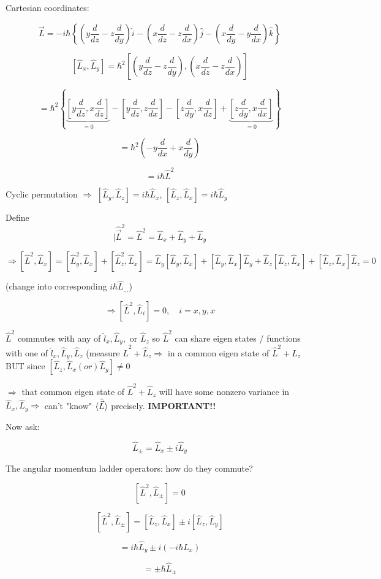 \documentclass{article}
\begin{document}
Cartesian coordinates:

$$\hat{\vec{L}} = -i \hbar \left\{ \left( y \frac{d}{dz} - z \frac{d}{dy} \right) \hat{i} - \left( x \frac{d}{dz} - z \frac{d}{dx} \right) \hat{j} - \left( x \frac{d}{dy} - y \frac{d}{dx} \right) \hat{k} \right\}$$

$$[\hat{L}_x, \hat{L}_y] = \hbar^2 \left[ \left( y \frac{d}{dz} - z \frac{d}{dy} \right), \left( x \frac{d}{dz} - z \frac{d}{dx} \right) \right]$$

$$ = \hbar^2 \left\{ 
\underbrace{\left[ y \frac{d}{dz}, x \frac{d}{dz} \right]}_{=0} - 
\left[ y \frac{d}{dz}, z \frac{d}{dx} \right] - 
\left[ z \frac{d}{dy}, x \frac{d}{dz} \right] + 
\underbrace{\left[ z \frac{d}{dy}, x \frac{d}{dx} \right]}_{=0} \right\}$$

$$ = \hbar^2 \left( -y \frac{d}{dx} + x \frac{d}{dy} \right)$$

$$ = i \hbar \hat{L}^2$$

Cyclic permutation $\Rightarrow$  $[\hat{L}_y, \hat{L}_z] = i \hbar \hat{L}_x$, $[\hat{L}_z, \hat{L}_x] = i \hbar \hat{L}_y$

Define $$|\hat{\vec{L}}^2 = \hat{L}^2 = \hat{L}_x + \hat{L}_y + \hat{L}_y$$

$$\Rightarrow [\hat{L}^2, \hat{L}_x] = [\hat{L}_y^2, \hat{L}_x] + [\hat{L}_z^2, \hat{L}_x]  = \hat{L}_y [ \hat{L}_y,\hat{L}_x] + [ \hat{L}_y,\hat{L}_x] \hat{L}_y + 
\hat{L}_z [ \hat{L}_z,\hat{L}_x] + [ \hat{L}_z,\hat{L}_x] \hat{L}_z  = 0$$

(change into corresponding $i \hbar \hat{L}_{...}$)

$$\Rightarrow [\hat{L}^2, \hat{L}_i] = 0, \quad i = x,y,x$$

$\hat{L}^2$ commutes with any of $\hat{l}_x, \hat{L}_y,$ or $\hat{L}_z$ so $\hat{L}^2$ can share eigen states / functions with one of $\hat{l}_x, \hat{L}_y,\hat{L}_z$ (measure $\hat{L}^2 + \hat{L}_z \Rightarrow$ in a common eigen state of $\hat{L}^2 + \hat{L}_z$ BUT since $[\hat{L}_z, \hat{L}_x (or) \hat{L}_y] \neq 0$

$\Rightarrow$ that common eigen state of $\hat{L}^2 + \hat{L}_z$ will have some nonzero variance in $\hat{L}_x, \hat{L}_y \Rightarrow$ can't "know" $\braket{\hat{\vec{L}}}$ precisely. \textbf{IMPORTANT!!}

Now ask: 

$$\hat{L}_\pm = \hat{L}_x \pm i \hat{L}_y$$

The angular momentum ladder operators: how do they commute?

$$[\hat{L}^2, \hat{L}_\pm] = 0$$

$$[\hat{L}^2, \hat{L}_\pm] = [\hat{L}_z, \hat{L}_x] \pm i  [\hat{L}_z, \hat{L}_y]$$

$$= i\hbar \hat{L}_y \pm i (- i \hbar L_x)$$

$$= \pm \hbar \hat{L}_\pm$$
\end{document}
